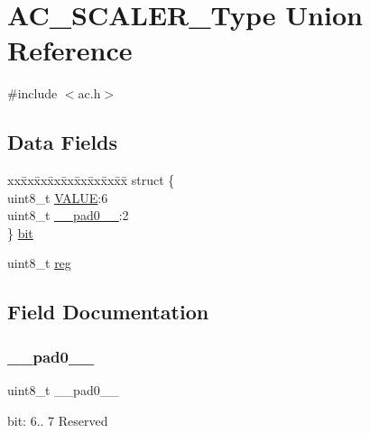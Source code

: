 \hypertarget{union_a_c___s_c_a_l_e_r___type}{}\section{A\+C\+\_\+\+S\+C\+A\+L\+E\+R\+\_\+\+Type Union Reference}
\label{union_a_c___s_c_a_l_e_r___type}


{\ttfamily \#include $<$ac.\+h$>$}

\subsection*{Data Fields}
\begin{DoxyCompactItemize}
\item 
\begin{tabbing}
xx\=xx\=xx\=xx\=xx\=xx\=xx\=xx\=xx\=\kill
struct \{\\
\>uint8\_t \mbox{\hyperlink{union_a_c___s_c_a_l_e_r___type_a9b29f156e0b21de552a157a1248ee48e}{VALUE}}:6\\
\>uint8\_t \mbox{\hyperlink{union_a_c___s_c_a_l_e_r___type_a8b4eebe79ded0459acec2f4950102ba3}{\_\_pad0\_\_}}:2\\
\} \mbox{\hyperlink{union_a_c___s_c_a_l_e_r___type_af536ab61549e3fdd6b3b5526037d1025}{bit}}\\

\end{tabbing}\item 
uint8\+\_\+t \mbox{\hyperlink{union_a_c___s_c_a_l_e_r___type_a9428adc9af4653a2050e2536b55dec8d}{reg}}
\end{DoxyCompactItemize}


\subsection{Field Documentation}
\mbox{\label{union_a_c___s_c_a_l_e_r___type_a8b4eebe79ded0459acec2f4950102ba3}} 
\subsubsection{\texorpdfstring{\_\_pad0\_\_}{\_\_pad0\_\_}}
{\footnotesize\ttfamily uint8\+\_\+t \+\_\+\+\_\+pad0\+\_\+\+\_\+}

bit\+: 6.. 7 Reserved \mbox{\label{union_a_c___s_c_a_l_e_r___type_af536ab61549e3fdd6b3b5526037d1025}} 
